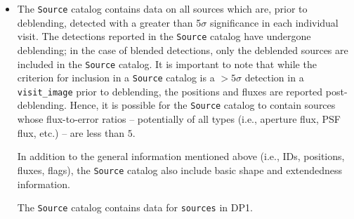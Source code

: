 \begin{itemize}
\item The \texttt{Source} catalog contains data on all sources which are, prior to deblending, detected with a greater than 5$\sigma$ significance in each individual visit.
The detections reported in the \texttt{Source} catalog have undergone deblending; in the case of blended detections, only the deblended sources are included in the \texttt{Source} catalog.
It is important to note that while the criterion for inclusion in a \texttt{Source} catalog is a $>5\sigma$ detection in a \texttt{visit\_image} prior to deblending, the positions and fluxes are reported post-deblending. Hence, it is possible for the \texttt{Source} catalog to contain sources whose \gls{flux}-to-error ratios -- potentially of all types (i.e., aperture \gls{flux}, PSF \gls{flux}, etc.) -- are less than $5$.

In addition to the general information mentioned above (i.e., IDs, positions, fluxes, flags), the \texttt{Source} catalog also include basic \gls{shape} and extendedness information.

The \texttt{Source} catalog contains data for \nsources \texttt{sources} in \gls{DP1}.



\end{itemize}
